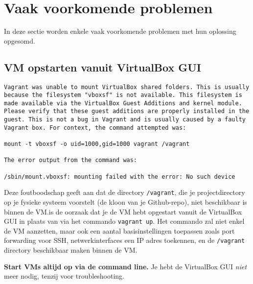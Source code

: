 \section{Vaak voorkomende problemen}%
\label{sec:problemen}

In deze sectie worden enkele vaak voorkomende problemen met hun oplossing opgesomd.

\subsection{VM opstarten vanuit VirtualBox GUI}

\begin{verbatim}
Vagrant was unable to mount VirtualBox shared folders. This is usually
because the filesystem "vboxsf" is not available. This filesystem is
made available via the VirtualBox Guest Additions and kernel module.
Please verify that these guest additions are properly installed in the
guest. This is not a bug in Vagrant and is usually caused by a faulty
Vagrant box. For context, the command attempted was:

mount -t vboxsf -o uid=1000,gid=1000 vagrant /vagrant

The error output from the command was:

/sbin/mount.vboxsf: mounting failed with the error: No such device
\end{verbatim}

Deze foutboodschap geeft aan dat de directory \texttt{/vagrant}, die je projectdirectory op je fysieke systeem voorstelt (de kloon van je Github-repo), niet beschikbaar is binnen de VM.\@Meestal is de oorzaak dat je de VM hebt opgestart vanuit de VirtualBox GUI in plaats van via het commando \texttt{vagrant up}. Het commando zal niet enkel de VM aanzetten, maar ook een aantal basisinstellingen toepassen zoals port forwarding voor SSH, netwerkinterfaces een IP adres toekennen, en de \texttt{/vagrant} directory beschikbaar maken binnen de VM.

\textbf{Start VMs altijd op via de command line.} Je hebt de VirtualBox GUI \textit{niet} meer nodig, tenzij voor troubleshooting.